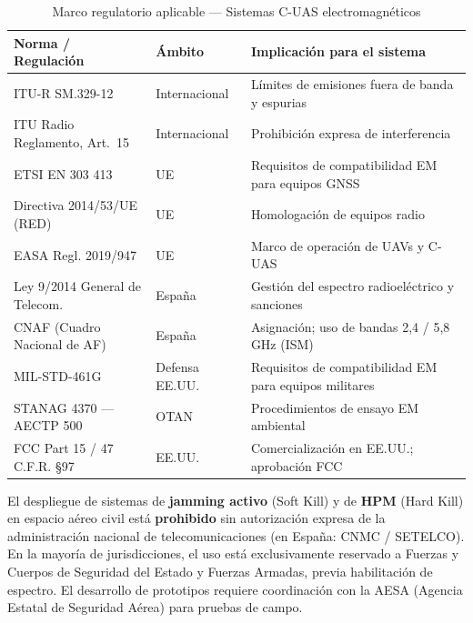 \documentclass[12pt,a4paper]{article}
\begin{document}
\begin{table}[H]
\centering
\caption{Marco regulatorio aplicable — Sistemas C-UAS electromagnéticos}
\label{tab:regulatorio}
\renewcommand{\arraystretch}{1.25}
\begin{tabularx}{\textwidth}{>{\hsize=0.6\hsize}X >{\hsize=0.6\hsize}X X}
\toprule
\textbf{Norma / Regulación} &
\textbf{Ámbito} &
\textbf{Implicación para el sistema} \\
\midrule
ITU-R SM.329-12 &
  Internacional &
  Límites de emisiones fuera de banda y espurias \\[3pt]

ITU Radio Reglamento, Art.~15 &
  Internacional &
  Prohibición expresa de interferencia \\[3pt]

ETSI EN 303 413 &
  UE &
  Requisitos de compatibilidad EM para equipos GNSS \\[3pt]

Directiva 2014/53/UE (RED) &
  UE &
  Homologación de equipos radio \\[3pt]

EASA Regl. 2019/947 &
  UE &
  Marco de operación de UAVs y C-UAS \\[3pt]

Ley 9/2014 General de Telecom. &
  España &
  Gestión del espectro radioeléctrico y sanciones \\[3pt]

CNAF (Cuadro Nacional de AF) &
  España &
  Asignación; uso de bandas 2,4 / 5,8\,GHz (ISM) \\[3pt]

MIL-STD-461G &
  Defensa EE.UU. &
  Requisitos de compatibilidad EM para equipos militares \\[3pt]

STANAG 4370 — AECTP 500 &
  OTAN &
  Procedimientos de ensayo EM ambiental \\[3pt]

FCC Part 15 / 47 C.F.R. §97 &
  EE.UU. &
  Comercialización en EE.UU.; aprobación FCC \\
\bottomrule
\end{tabularx}
\end{table}

\begin{correccion}
  El despliegue de sistemas de \textbf{jamming activo} (Soft Kill) y
  de \textbf{HPM} (Hard Kill) en espacio aéreo civil está
  \textbf{prohibido} sin autorización expresa de la administración
  nacional de telecomunicaciones (en España: CNMC / SETELCO).
  En la mayoría de jurisdicciones, el uso está exclusivamente reservado
  a Fuerzas y Cuerpos de Seguridad del Estado y Fuerzas Armadas,
  previa habilitación de espectro.
  El desarrollo de prototipos requiere coordinación con la AESA
  (Agencia Estatal de Seguridad Aérea) para pruebas de campo.
\end{correccion}
\end{document}
